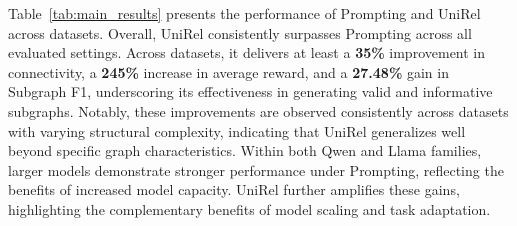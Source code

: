 



Table~\ref{tab:main_results} presents the performance of Prompting and UniRel across datasets.
Overall, UniRel consistently surpasses Prompting across all evaluated settings.
Across datasets, it delivers at least a \textbf{35\%} improvement in connectivity, a \textbf{245\%} increase in average reward, and a \textbf{27.48\%} gain in Subgraph F1, underscoring its effectiveness in generating valid and informative subgraphs.
Notably, these improvements are observed consistently across datasets with varying structural complexity, indicating that UniRel generalizes well beyond specific graph characteristics.
Within both Qwen and Llama families, larger models demonstrate stronger performance under Prompting, reflecting the benefits of increased model capacity.
UniRel further amplifies these gains, highlighting the complementary benefits of model scaling and task adaptation.

